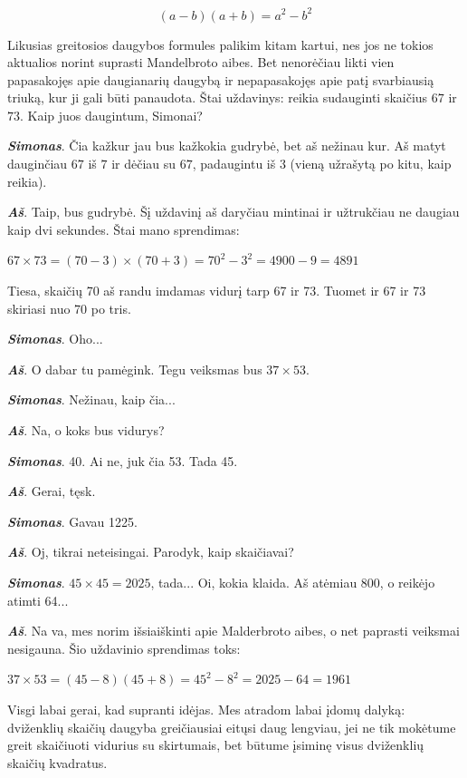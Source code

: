 \documentclass[a4paper]{article}
\newcommand{\say}[1]{\textbf{\textit{#1}}}
\begin{document}
$$(a-b)(a+b)=a^2-b^2$$

Likusias greitosios daugybos formules palikim kitam kartui, nes jos ne tokios aktualios norint suprasti Mandelbroto aibes. Bet nenorėčiau likti vien papasakojęs apie daugianarių daugybą ir nepapasakojęs apie patį svarbiausią triuką, kur ji gali būti panaudota. Štai uždavinys: reikia sudauginti skaičius $67$ ir $73$. Kaip juos daugintum, Simonai?

\say{Simonas}. Čia kažkur jau bus kažkokia gudrybė, bet aš nežinau kur. Aš matyt dauginčiau $67$ iš $7$ ir dėčiau su $67$, padaugintu iš $3$ (vieną užrašytą po kitu, kaip reikia).

\say{Aš}. Taip, bus gudrybė. Šį uždavinį aš daryčiau mintinai ir užtrukčiau ne daugiau kaip dvi sekundes. Štai mano sprendimas:

$67\times 73 = (70-3)\times (70 + 3) = 70^2 - 3^2 = 4900 - 9 = 4891$

Tiesa, skaičių 70 aš randu imdamas vidurį tarp 67 ir 73. Tuomet ir 67 ir 73 skiriasi nuo 70 po tris.

\say{Simonas}. Oho...

\say{Aš}. O dabar tu pamėgink. Tegu veiksmas bus $37 \times 53$. 

\say{Simonas}. Nežinau, kaip čia...

\say{Aš}. Na, o koks bus vidurys?

\say{Simonas}. 40. Ai ne, juk čia 53. Tada 45.

\say{Aš}. Gerai, tęsk. 

\say{Simonas}. Gavau 1225. 

\say{Aš}. Oj, tikrai neteisingai. Parodyk, kaip skaičiavai?

\say{Simonas}. $45\times 45 = 2025$, tada... Oi, kokia klaida. Aš atėmiau 800, o reikėjo atimti 64...

\say{Aš}. Na va, mes norim išsiaiškinti apie Malderbroto aibes, o net paprasti veiksmai nesigauna. Šio uždavinio sprendimas toks:

 $37 \times 53 = (45 - 8)(45+8)=45^2-8^2=2025-64=1961$
 
 Visgi labai gerai, kad supranti idėjas. Mes atradom labai įdomų dalyką: dviženklių skaičių daugyba greičiausiai eitųsi daug lengviau, jei ne tik mokėtume greit skaičiuoti vidurius su skirtumais,  bet būtume įsiminę visus dviženklių skaičių kvadratus. 
 
\end{document}

